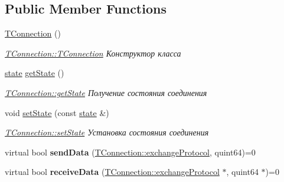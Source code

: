 \subsection*{Public Member Functions}
\begin{DoxyCompactItemize}
\item 
\mbox{\label{classconnection_1_1_t_connection_a2853c8ac857d43657d48c18ceeaef120}} 
\hyperlink{classconnection_1_1_t_connection_a2853c8ac857d43657d48c18ceeaef120}{T\+Connection} ()
\begin{DoxyCompactList}\small\item\em \hyperlink{classconnection_1_1_t_connection_a2853c8ac857d43657d48c18ceeaef120}{T\+Connection\+::\+T\+Connection} Конструктор класса \end{DoxyCompactList}\item 
\hyperlink{classconnection_1_1_t_connection_aee7dfb7510592bd2697ab6f906b9612c}{state} \hyperlink{classconnection_1_1_t_connection_a7944d50c5733279cf0fdfd8c87c3b237}{get\+State} ()
\begin{DoxyCompactList}\small\item\em \hyperlink{classconnection_1_1_t_connection_a7944d50c5733279cf0fdfd8c87c3b237}{T\+Connection\+::get\+State} Получение состояния соединения \end{DoxyCompactList}\item 
void \hyperlink{classconnection_1_1_t_connection_aa61ae6037f6b70cd97c9fc9c04f43629}{set\+State} (const \hyperlink{classconnection_1_1_t_connection_aee7dfb7510592bd2697ab6f906b9612c}{state} \&)
\begin{DoxyCompactList}\small\item\em \hyperlink{classconnection_1_1_t_connection_aa61ae6037f6b70cd97c9fc9c04f43629}{T\+Connection\+::set\+State} Установка состояния соединения \end{DoxyCompactList}\item 
\mbox{\label{classconnection_1_1_t_connection_ae0cbb8d3bb954f20796d53c704a8359c}} 
virtual bool {\bfseries send\+Data} (\hyperlink{classconnection_1_1_t_connection_a3550181cb2fa72eccfa55d23f45cea34}{T\+Connection\+::exchange\+Protocol}, quint64)=0
\item 
\mbox{\label{classconnection_1_1_t_connection_a2e2fa21e963560dc8836ce94b6e168da}} 
virtual bool {\bfseries receive\+Data} (\hyperlink{classconnection_1_1_t_connection_a3550181cb2fa72eccfa55d23f45cea34}{T\+Connection\+::exchange\+Protocol} $\ast$, quint64 $\ast$)=0
\end{DoxyCompactItemize}
